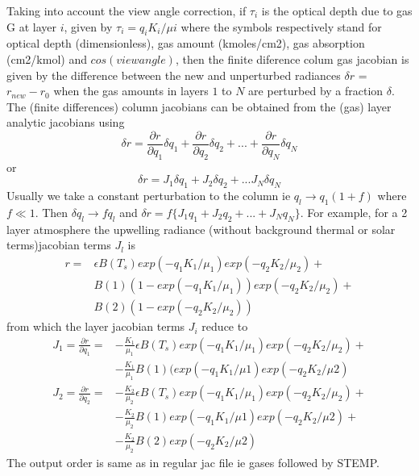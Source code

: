 \documentclass[12pt]{article}
\begin{document}
Taking into account the view angle correction, if $\tau_{i}$ is the optical 
depth due to gas G at layer $i$, given by $\tau_{i} = q_{i} K_{i}/\mu{i}$ 
where the symbols respectively stand for optical depth (dimensionless), gas 
amount (kmoles/cm2), gas absorption (cm2/kmol) and $cos(view angle)$, then 
the finite diference colum gas jacobian is 
given by the difference between the new and unperturbed radiances 
$\delta r$ = $r_{new} - r_{0}$ when the gas amounts in layers $1$ to $N$ are 
perturbed by a fraction $\delta$. The (finite differences) column jacobians 
can be obtained from the (gas) layer analytic jacobians using
\[
\delta r = \frac{\partial r}{\partial q_1} \delta q_1 + 
           \frac{\partial r}{\partial q_2} \delta q_2 + ... + 
           \frac{\partial r}{\partial q_N} \delta q_N
\] 
or 
\[
\delta r = J_{1} \delta q_1 + J_{2} \delta q_2 + ...
               J_{N} \delta q_N
\]
Usually we take a constant perturbation to the column ie $q_{l} \rightarrow 
q_{1}(1 + f)$ where $f \ll 1$. Then $\delta q_{l} \rightarrow f q_{l}$ and
$\delta r = f \{ J_{1} q_1 + J_{2} q_2 + ... + J_{N} q_N \} $. For example, 
for a 2 layer atmosphere the upwelling radiance (without background thermal 
or solar terms)jacobian terms $J_{l}$ is 
\begin{eqnarray*}
r = & \epsilon B(T_{s}) exp(-q_{1} K_{1}/\mu_{1})exp(-q_{2} K_{2}/\mu_{2}) +\\
    & B(1)(1-exp(-q_{1} K_{1}/\mu_{1}))exp(-q_{2} K_{2}/\mu_{2}) + \\
    & B(2)(1-exp(-q_{2} K_{2}/\mu_{2}))
\end{eqnarray*}
from which the layer jacobian terms $J_{i}$ reduce to
\begin{eqnarray*}
J_{1} = \frac{\partial r}{\partial q_1} = & 
 -\frac{K_1}{\mu_1}\epsilon B(T_{s})exp(-q_1 K_1/\mu_1)exp(-q_2 K_2/\mu_2) + \\
&-\frac{K_1}{\mu_1} B(1)(exp(-q_{1} K_{1}/\mu{1})exp(-q_{2} K_{2}/\mu{2})
\end{eqnarray*}
\begin{eqnarray*}
J_{2} = \frac{\partial r}{\partial q_2} = & 
-\frac{K_2}{\mu_2}\epsilon B(T_{s})exp(-q_1 K_1/\mu_1)exp(-q_2 K_2/\mu_2) + \\
& -\frac{K_2}{\mu_2} B(1)exp(-q_{1} K_{1}/\mu{1})exp(-q_{2} K_{2}/\mu{2}) + \\
& -\frac{K_2}{\mu_2} B(2)exp(-q_{2} K_{2}/\mu{2})
\end{eqnarray*}
The output order is same as in regular jac file ie gases followed by STEMP.
\end{document}
